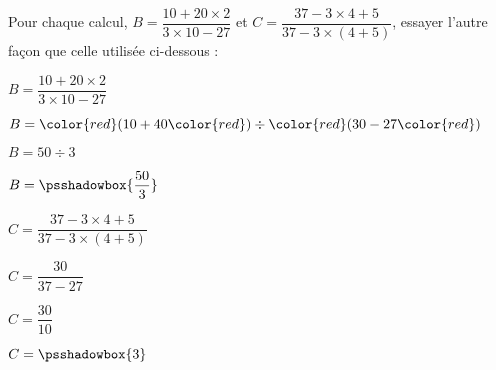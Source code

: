 \begin{exemple*1}
    Pour chaque calcul, $B=\dfrac{10+20\times 2}{3\times 10 - 27}$  et $C=\dfrac{37-3\times 4+5}{37-3\times (4+5)}$, 
    essayer l'autre façon que celle utilisée ci-dessous : 

    \bigskip
    \begin{minipage}{0.45\linewidth}
        \begin{spacing}{1.5}
            \begin{list}{}{}
                \item $B=\dfrac{10+20\times 2}{3\times 10 - 27}$            
                \item $B={\color{red}(}10+40{\color{red})}\div {\color{red}(}30 - 27{\color{red})}$            
                \item $B=50\div 3$
                \item $B=\psshadowbox{\dfrac{50}{3}}$
            \end{list}
        \end{spacing}
    \end{minipage}      
    \begin{minipage}{0.5\linewidth}
        \begin{spacing}{1.5}
            \begin{list}{}{}
                \item $C=\dfrac{37-3\times 4+5}{37-3\times (4+5)}$            
                \item $C=\dfrac{30}{37-27}$
                \item $C=\dfrac{30}{10}$
                \item $C=\psshadowbox{3}$            
            \end{list}
        \end{spacing}
    \end{minipage}   
\end{exemple*1}
